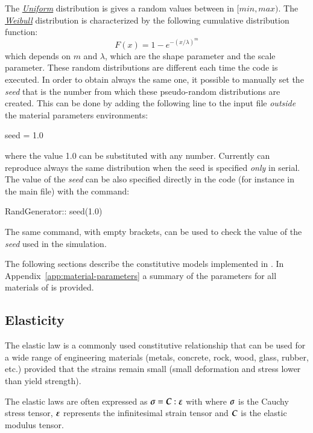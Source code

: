 The
\href{http://en.wikipedia.org/wiki/Uniform\_distribution\_(continuous)}{\emph{Uniform}}
distribution is gives a random values between in $[min, max)$. The
\href{http://en.wikipedia.org/wiki/Weibull\_distribution}{\emph{Weibull}}
distribution is characterized by the following cumulative distribution
function:
\begin{equation}
  F(x) = 1- e^{-\left({x/\lambda}\right)^m}
\end{equation}
which depends on $m$ and $\lambda$, which are the shape parameter and
the scale parameter. These random distributions are different each
time the code is executed. In order to obtain always the same one, it
possible to manually set the \emph{seed} that is the number from which
these pseudo-random distributions are created. This can be done by
adding the following line to the input file \emph{outside} the
material parameters environments:
\begin{cpp}
  seed = 1.0
\end{cpp}
where the value 1.0 can be substituted with any number. Currently
\akantu can reproduce always the same distribution when the seed is
specified \emph{only} in serial. The value of the \emph{seed} can be
also specified directly in the code (for instance in the main file)
with the command:
\begin{cpp}
  RandGenerator:: seed(1.0)
\end{cpp}
The same command, with empty brackets, can be used to check the value
of the \emph{seed} used in the simulation.

The following sections describe the constitutive models implemented in
\akantu. In Appendix~\ref{app:material-parameters} a summary of the
parameters for all materials of \akantu is provided.


\subsection{Elasticity}

The elastic law is a commonly used constitutive relationship that can be used
for a wide range of engineering materials (\eg metals, concrete, rock, wood,
glass, rubber, etc.) provided that the strains remain small (\ie small
deformation and stress lower than yield strength).

The elastic laws are often expressed as $\boldsymbol{\sigma} =
\boldsymbol{C}:\boldsymbol{\varepsilon}$ with where $\boldsymbol{\sigma}$ is the Cauchy stress tensor,
$\boldsymbol{\varepsilon}$ represents the infinitesimal strain tensor and $\boldsymbol{C}$ is the
elastic modulus tensor.

